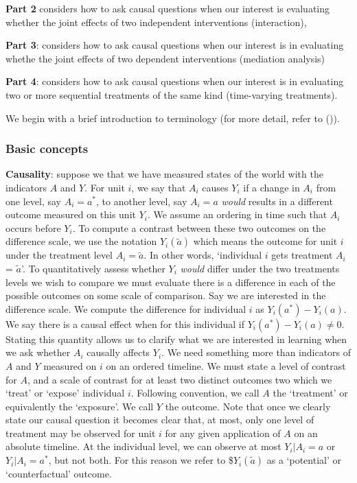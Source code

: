 \documentclass[
  single column]{article}
\begin{document}
\textbf{Part 2} considers how to ask causal questions when our interest
is evaluating whether the joint effects of two independent interventions
(interaction),

\textbf{Part 3}: considers how to ask causal questions when our interest
is in evaluating whethe the joint effects of two dependent interventions
(mediation analysis)

\textbf{Part 4}: considers how to ask causal questions when our interest
is in evaluating two or more sequential treatments of the same kind
(time-varying treatments).

We begin with a brief introduction to terminology (for more detail,
refer to ()).

\subsubsection{Basic concepts}\label{basic-concepts}

\textbf{Causality}: suppose we that we have measured states of the world
with the indicators \(A\) and \(Y\). For unit \(i\), we say that \(A_i\)
causes \(Y_i\) if a change in \(A_i\) from one level, say \(A_i = a^*\),
to another level, say \(A_i = a\) \emph{would} results in a different
outcome measured on this unit \(Y_i\). We assume an ordering in time
such that \(A_i\) occurs before \(Y_i\). To compute a contrast between
these two outcomes on the difference scale, we use the notation
\(Y_i(\tilde{a})\) which means the outcome for unit \(i\) under the
treatment level \(A_i  = \tilde{a}\). In other words, `individual \(i\)
gets treatment \(A_i\) = \(\tilde{a}\)'. To quantitatively assess
whether \(Y_i\) \emph{would} differ under the two treatments levels we
wish to compare we must evaluate there is a difference in each of the
possible outcomes on some scale of comparison. Say we are interested in
the difference scale. We compute the difference for individual \(i\) as
\(Y_i(a^*) - Y_i(a)\). We say there is a causal effect when for this
individual if \(Y_i(a^*) - Y_i(a) \neq 0\). Stating this quantity allows
us to clarify what we are interested in learning when we ask whether
\(A_i\) causally affects \(Y_i\). We need something more than indicators
of \(A\) and \(Y\) measured on \(i\) on an ordered timeline. We must
state a level of contrast for \(A\), and a scale of contrast for at
least two distinct outcomes two which we `treat' or `expose' individual
\(i\). Following convention, we call \(A\) the `treatment' or
equivalently the `exposure'. We call \(Y\) the outcome. Note that once
we clearly state our causal question it becomes clear that, at most,
only one level of treatment may be observed for unit \(i\) for any given
application of \(A\) on an absolute timeline. At the individual level,
we can observe at most \(Y_i|A_i =a\) or \(Y_i|A_i =a^*\), but not both.
For this reason we refer to \$\(Y_i(\tilde{a})\) as a `potential' or
`counterfactual' outcome.
\end{document}
